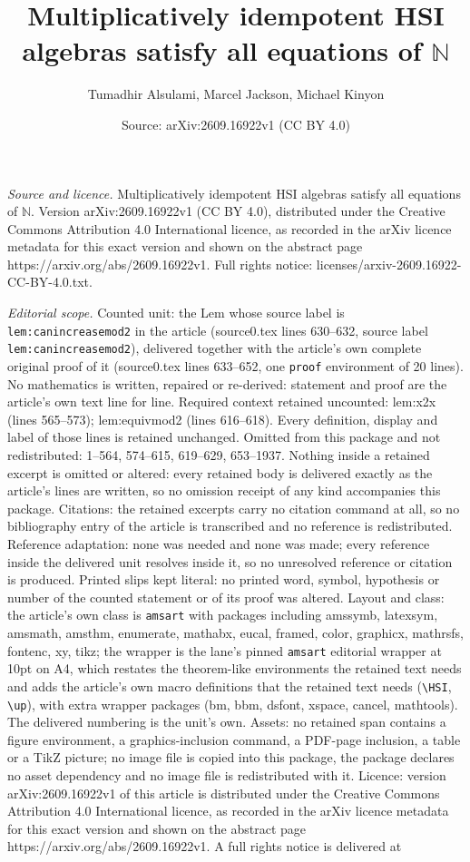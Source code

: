 \documentclass[10pt,a4paper]{amsart}
\title[Multiplicatively idempotent HSI algebras satisfy all equatio]{Multiplicatively idempotent HSI algebras satisfy all equations of $\mathbb{N}$}
\author{Tumadhir Alsulami, Marcel Jackson, Michael Kinyon}
\date{Source: arXiv:2609.16922v1 (CC BY 4.0)}
\begin{document}
\maketitle

\noindent\emph{Source and licence.} Multiplicatively idempotent HSI algebras satisfy all equations of $\mathbb{N}$. Version arXiv:2609.16922v1 (CC BY 4.0), distributed under the Creative Commons Attribution 4.0 International licence, as recorded in the arXiv licence metadata for this exact version and shown on the abstract page https://arxiv.org/abs/2609.16922v1. Full rights notice: licenses/arxiv-2609.16922-CC-BY-4.0.txt.\par\smallskip

\noindent\textit{Editorial scope.} Counted unit: the Lem whose source label is \texttt{lem:canincreasemod2} in the article (source0.tex lines 630--632, source label \texttt{lem:canincreasemod2}), delivered together with the article's own complete original proof of it (source0.tex lines 633--652, one \texttt{proof} environment of 20 lines). No mathematics is written, repaired or re-derived: statement and proof are the article's own text line for line. Required context retained uncounted: lem:x2x (lines 565--573); lem:equivmod2 (lines 616--618). Every definition, display and label of those lines is retained unchanged. Omitted from this package and not redistributed: 1--564, 574--615, 619--629, 653--1937. Nothing inside a retained excerpt is omitted or altered: every retained body is delivered exactly as the article's lines are written, so no omission receipt of any kind accompanies this package. Citations: the retained excerpts carry no citation command at all, so no bibliography entry of the article is transcribed and no reference is redistributed. Reference adaptation: none was needed and none was made; every reference inside the delivered unit resolves inside it, so no unresolved reference or citation is produced. Printed slips kept literal: no printed word, symbol, hypothesis or number of the counted statement or of its proof was altered. Layout and class: the article's own class is \texttt{amsart} with packages including amssymb, latexsym, amsmath, amsthm, enumerate, mathabx, eucal, framed, color, graphicx, mathrsfs, fontenc, xy, tikz; the wrapper is the lane's pinned \texttt{amsart} editorial wrapper at 10pt on A4, which restates the theorem-like environments the retained text needs and adds the article's own macro definitions that the retained text needs (\texttt{\textbackslash HSI}, \texttt{\textbackslash up}), with extra wrapper packages (bm, bbm, dsfont, xspace, cancel, mathtools). The delivered numbering is the unit's own. Assets: no retained span contains a figure environment, a graphics-inclusion command, a PDF-page inclusion, a table or a TikZ picture; no image file is copied into this package, the package declares no asset dependency and no image file is redistributed with it. Licence: version arXiv:2609.16922v1 of this article is distributed under the Creative Commons Attribution 4.0 International licence, as recorded in the arXiv licence metadata for this exact version and shown on the abstract page https://arxiv.org/abs/2609.16922v1. A full rights notice is delivered at 
\end{document}
